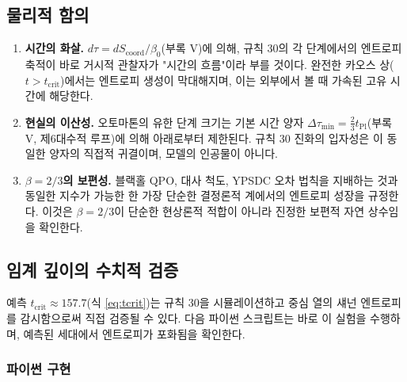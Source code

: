 \documentclass[11pt,a4paper]{article}
\begin{document}
	\subsection{물리적 함의}
	\label{subsec:implications}
	
	\begin{enumerate}
		\item \textbf{시간의 화살.} \(d\tau = dS_{\mathrm{coord}}/\beta_{0}\)(부록 V)에 의해, 규칙 30의 각 단계에서의 엔트로피 축적이 바로 거시적 관찰자가 "시간의 흐름"이라 부를 것이다. 완전한 카오스 상(\(t > t_{\mathrm{crit}}\))에서는 엔트로피 생성이 막대해지며, 이는 외부에서 볼 때 가속된 고유 시간에 해당한다.
		\item \textbf{현실의 이산성.} 오토마톤의 유한 단계 크기는 기본 시간 양자 \(\Delta\tau_{\min} = \frac{2}{3}t_{\mathrm{Pl}}\)(부록 V, 제6대수적 루프)에 의해 아래로부터 제한된다. 규칙 30 진화의 입자성은 이 동일한 양자의 직접적 귀결이며, 모델의 인공물이 아니다.
		\item \textbf{\(\beta=2/3\)의 보편성.} 블랙홀 QPO, 대사 척도, YPSDC 오차 법칙을 지배하는 것과 동일한 지수가 가능한 한 가장 단순한 결정론적 계에서의 엔트로피 성장을 규정한다. 이것은 \(\beta=2/3\)이 단순한 현상론적 적합이 아니라 진정한 보편적 자연 상수임을 확인한다.
	\end{enumerate}
	
	\subsection{임계 깊이의 수치적 검증}
	\label{subsec:verification}
	
	예측 \(t_{\mathrm{crit}} \approx 157.7\)(식 \ref{eq:tcrit})는 규칙 30을 시뮬레이션하고 중심 열의 섀넌 엔트로피를 감시함으로써 직접 검증될 수 있다. 다음 파이썬 스크립트는 바로 이 실험을 수행하며, 예측된 세대에서 엔트로피가 포화됨을 확인한다.
	
	\subsubsection*{파이썬 구현}
	
\end{document}
